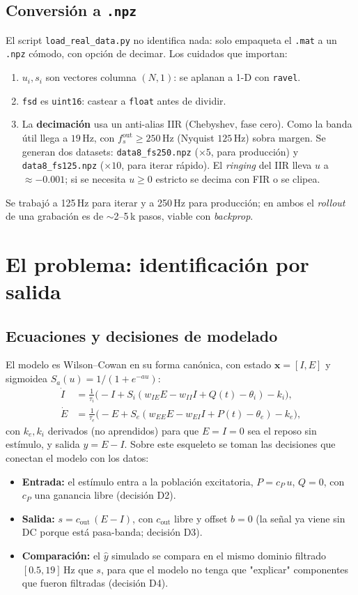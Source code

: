 \documentclass[11pt,a4paper]{article}
\begin{document}
\subsection*{Conversión a \texttt{.npz}}
El script \texttt{load\_real\_data.py} no identifica nada: solo empaqueta el \texttt{.mat} a un \texttt{.npz} cómodo, con opción de decimar. Los cuidados que importan:
\begin{enumerate}[leftmargin=1.6em]
  \item $u_i, s_i$ son vectores columna $(N,1)$: se aplanan a 1-D con \texttt{ravel}.
  \item \texttt{fsd} es \texttt{uint16}: castear a \texttt{float} antes de dividir.
  \item La \textbf{decimación} usa un anti-alias IIR (Chebyshev, fase cero). Como la banda útil llega a $19$\,Hz, con $f_s^{\text{out}} \ge 250$\,Hz (Nyquist $125$\,Hz) sobra margen. Se generan dos datasets: \texttt{data8\_fs250.npz} ($\times 5$, para producción) y \texttt{data8\_fs125.npz} ($\times 10$, para iterar rápido). El \emph{ringing} del IIR lleva $u$ a $\approx -0.001$; si se necesita $u\ge0$ estricto se decima con FIR o se clipea.
\end{enumerate}
Se trabajó a 125\,Hz para iterar y a 250\,Hz para producción; en ambos el \emph{rollout} de una grabación es de $\sim$2--5\,k pasos, viable con \emph{backprop}.

\section{El problema: identificación por salida}

\subsection*{Ecuaciones y decisiones de modelado}
El modelo es Wilson--Cowan en su forma canónica, con estado $\mathbf{x}=[I,E]$ y sigmoidea $S_a(u)=1/(1+e^{-a u})$:
\begin{align}
\dot I &= \tfrac{1}{\tau_i}\big(-I + S_i(w_{IE}E - w_{II}I + Q(t) - \theta_i) - k_i\big),\\
\dot E &= \tfrac{1}{\tau_e}\big(-E + S_e(w_{EE}E - w_{EI}I + P(t) - \theta_e) - k_e\big),
\end{align}
con $k_e,k_i$ derivados (no aprendidos) para que $E=I=0$ sea el reposo sin estímulo, y salida $y=E-I$. Sobre este esqueleto se toman las decisiones que conectan el modelo con los datos:
\begin{itemize}[leftmargin=1.4em]
  \item \textbf{Entrada:} el estímulo entra a la población excitatoria, $P = c_P\, u$, $Q = 0$, con $c_P$ una ganancia libre (decisión D2).
  \item \textbf{Salida:} $s = c_{\text{out}}\,(E-I)$, con $c_{\text{out}}$ libre y offset $b=0$ (la señal ya viene sin DC porque está pasa-banda; decisión D3).
  \item \textbf{Comparación:} el $\hat y$ simulado se compara en el mismo dominio filtrado $[0.5,19]$\,Hz que $s$, para que el modelo no tenga que "explicar" componentes que fueron filtradas (decisión D4).
\end{itemize}
\end{document}
